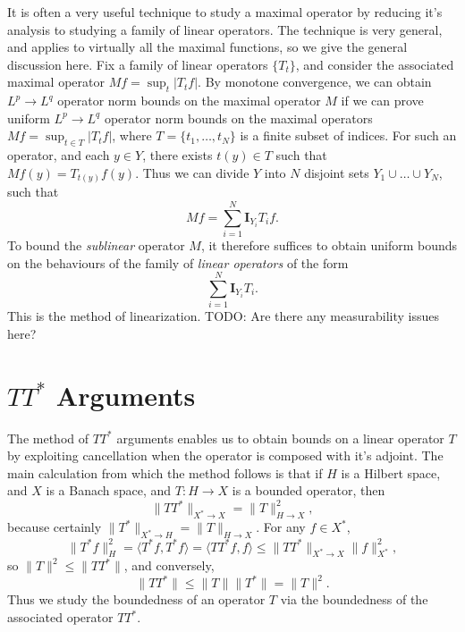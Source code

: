 It is often a very useful technique to study a maximal operator by reducing it's analysis to studying a family of linear operators. The technique is very general, and applies to virtually all the maximal functions, so we give the general discussion here. Fix a family of linear operators $\{ T_t \}$, and consider the associated maximal operator $Mf = \sup_t |T_t f|$. By monotone convergence, we can obtain $L^p \to L^q$ operator norm bounds on the maximal operator $M$ if we can prove uniform $L^p \to L^q$ operator norm bounds on the maximal operators $Mf = \sup_{t \in T} |T_t f|$, where $T = \{ t_1, \dots, t_N \}$ is a finite subset of indices. For such an operator, and each $y \in Y$, there exists $t(y) \in T$ such that $Mf(y) = T_{t(y)} f(y)$. Thus we can divide $Y$ into $N$ disjoint sets $Y_1 \cup \dots \cup Y_N$, such that
%
\[ Mf = \sum_{i = 1}^N \mathbf{I}_{Y_i} T_i f. \]
%
To bound the \emph{sublinear} operator $M$, it therefore suffices to obtain uniform bounds on the behaviours of the family of \emph{linear operators} of the form
%
\[ \sum_{i = 1}^N \mathbf{I}_{Y_i} T_i. \]
%
This is the method of linearization. TODO: Are there any measurability issues here?

\section{$TT^*$ Arguments}

The method of $TT^*$ arguments enables us to obtain bounds on a linear operator $T$ by exploiting cancellation when the operator is composed with it's adjoint. The main calculation from which the method follows is that if $H$ is a Hilbert space, and $X$ is a Banach space, and $T: H \to X$ is a bounded operator, then
%
\[ \| T T^* \|_{X^* \to X} = \| T \|_{H \to X}^2, \]
%
because certainly $\| T^* \|_{X^* \to H} = \| T \|_{H \to X}$. For any $f \in X^*$,
%
\[ \| T^* f \|_H^2 = \langle T^* f, T^* f \rangle = \langle TT^* f, f \rangle \leq \| TT^* \|_{X^* \to X} \| f \|_{X^*}^2, \]
%
so $\| T \|^2 \leq \| TT^* \|$, and conversely,
%
\[ \| TT^* \| \leq \| T \| \| T^* \| = \| T \|^2. \]
%
Thus we study the boundedness of an operator $T$ via the boundedness of the associated operator $TT^*$.

